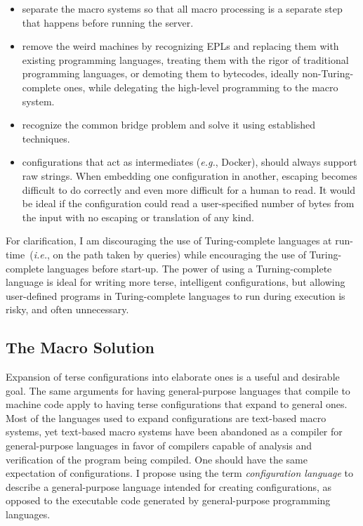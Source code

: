 \documentclass[letterpaper,twocolumn,10pt]{article}
\begin{document}
\begin{itemize}
\item separate the macro systems so that all macro processing is a separate step that happens before running the server.
\item remove the weird machines by recognizing EPLs and replacing them with existing programming languages, treating them with the rigor of traditional programming languages, or demoting them to bytecodes, ideally non-Turing-complete ones, while delegating the high-level programming to the macro system.
\item recognize the common bridge problem and solve it using established techniques.
\item configurations that act as intermediates (\emph{e.g.}, Docker), should always support raw strings. When embedding one configuration in another, escaping becomes difficult to do correctly and even more difficult for a human to read. It would be ideal if the configuration could read a user-specified number of bytes from the input with no escaping or translation of any kind.
\end{itemize}

For clarification, I am discouraging the use of Turing-complete languages at run-time~(\emph{i.e.}, on the path taken by queries) while encouraging the use of Turing-complete languages before start-up. The power of using a Turning-complete language is ideal for writing more terse, intelligent configurations, but allowing user-defined programs in Turing-complete languages to run during execution is risky, and often unnecessary.

\subsection{The Macro Solution}
Expansion of terse configurations into elaborate ones is a useful and desirable goal. The same arguments for having general-purpose languages that compile to machine code apply to having terse configurations that expand to general ones. Most of the languages used to expand configurations are text-based macro systems, yet text-based macro systems have been abandoned as a compiler for general-purpose languages in favor of compilers capable of analysis and verification of the program being compiled. One should have the same expectation of configurations. I propose using the term \emph{configuration language} to describe a general-purpose language intended for creating configurations, as opposed to the executable code generated by general-purpose programming languages.
\end{document}
